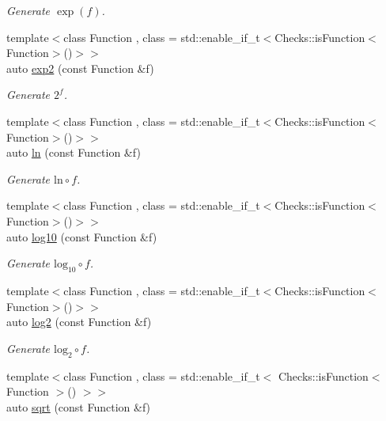 \begin{DoxyCompactItemize}
\begin{DoxyCompactList}\small\item\em Generate $ \exp(f) $. \end{DoxyCompactList}\item 
{\footnotesize template$<$class Function , class  = std\+::enable\+\_\+if\+\_\+t$<$\+Checks\+::is\+Function$<$\+Function$>$()$>$$>$ }\\auto \hyperlink{group__CMathGroup_ga7724faf7db6e9583ac91df322c26ecf5}{exp2} (const Function \&f)
\begin{DoxyCompactList}\small\item\em Generate $2^f$. \end{DoxyCompactList}\item 
{\footnotesize template$<$class Function , class  = std\+::enable\+\_\+if\+\_\+t$<$\+Checks\+::is\+Function$<$\+Function$>$()$>$$>$ }\\auto \hyperlink{group__CMathGroup_ga31313571b08f65b853643e14fc8fc714}{ln} (const Function \&f)
\begin{DoxyCompactList}\small\item\em Generate $ \mathrm{ln}\circ f $. \end{DoxyCompactList}\item 
{\footnotesize template$<$class Function , class  = std\+::enable\+\_\+if\+\_\+t$<$\+Checks\+::is\+Function$<$\+Function$>$()$>$$>$ }\\auto \hyperlink{group__CMathGroup_gae9506f4e0e6fad4f756f636044697bfe}{log10} (const Function \&f)
\begin{DoxyCompactList}\small\item\em Generate $ \mathrm{log}_{10}\circ f $. \end{DoxyCompactList}\item 
{\footnotesize template$<$class Function , class  = std\+::enable\+\_\+if\+\_\+t$<$\+Checks\+::is\+Function$<$\+Function$>$()$>$$>$ }\\auto \hyperlink{group__CMathGroup_gacd6be7e9de7bbd54c852f0acf0c7d2c2}{log2} (const Function \&f)
\begin{DoxyCompactList}\small\item\em Generate $ \mathrm{log}_{2}\circ f $. \end{DoxyCompactList}\item 
{\footnotesize template$<$class Function , class  = std\+::enable\+\_\+if\+\_\+t$<$ Checks\+::is\+Function$<$ Function $>$() $>$$>$ }\\auto \hyperlink{group__CMathGroup_ga136c890475e48f88469a737d95368d05}{sqrt} (const Function \&f)

\end{DoxyCompactItemize}
